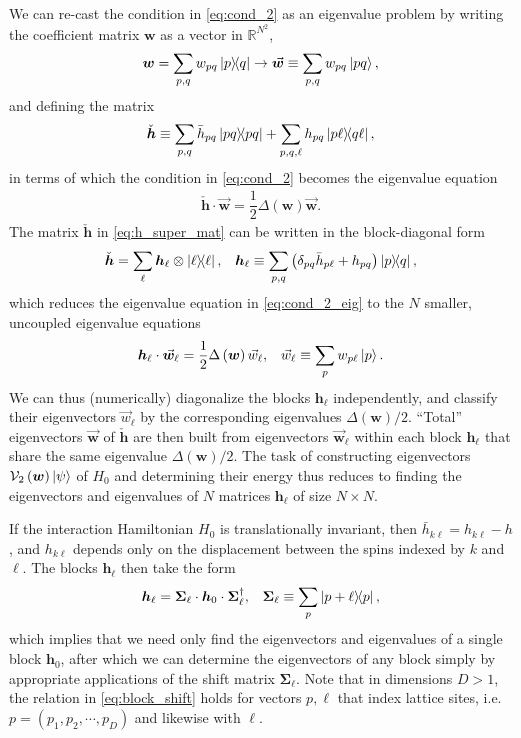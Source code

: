 \documentclass[nofootinbib,notitlepage,11pt]{revtex4-2}
\newcommand{\f}[2]{\dfrac{#1}{#2}} %
\newcommand{\p}[1]{\left(#1\right)} %
\renewcommand{\c}{\cdot} %
\newcommand{\m}{\bm} %
\renewcommand{\v}{\vec} %
\newcommand{\1}{\mathds{1}}
\newcommand{\V}{\mathcal{V}}
\newcommand{\RR}{\mathbb{R}}
\begin{document}
We can re-cast the condition in \eqref{eq:cond_2} as an eigenvalue
problem by writing the coefficient matrix $\m w$ as a vector in
$\RR^{N^2}$,
\begin{align}
  \m w = \sum_{p,q} w_{pq} \op{p}{q}
  \to \v{\m w} \equiv \sum_{p,q} w_{pq} \ket{pq},
\end{align}
and defining the matrix
\begin{align}
  \check{\m h}
  \equiv \sum_{p,q} \bar h_{pq} \op{pq}
  + \sum_{p,q,\ell} h_{pq} \op{p\ell}{q\ell},
  \label{eq:h_super_mat}
\end{align}
in terms of which the condition in \eqref{eq:cond_2} becomes the
eigenvalue equation
\begin{align}
  \check{\m h} \c \v{\m w} = \f12 \Delta\p{\m w} \v{\m w}.
  \label{eq:cond_2_eig}
\end{align}
The matrix $\check{\m h}$ in \eqref{eq:h_super_mat} can be written in
the block-diagonal form
\begin{align}
  \check{\m h} = \sum_\ell \m h_\ell \otimes \op{\ell},
  &&
  \m h_\ell
  \equiv \sum_{p,q}\p{\delta_{pq} \bar h_{p\ell} + h_{pq}} \op{p}{q},
\end{align}
which reduces the eigenvalue equation in \eqref{eq:cond_2_eig} to the
$N$ smaller, uncoupled eigenvalue equations
\begin{align}
  \m h_\ell \c \v{\m w}_\ell = \f12 \Delta\p{\m w} \v w_\ell,
  &&
  \v w_\ell \equiv \sum_p w_{p\ell} \ket{p}.
  \label{eq:cond_2_eig_block}
\end{align}
We can thus (numerically) diagonalize the blocks $\m h_\ell$
independently, and classify their eigenvectors $\v w_\ell$ by the
corresponding eigenvalues $\Delta\p{\m w}/2$.  ``Total'' eigenvectors
$\v{\m w}$ of $\check{\m h}$ are then built from eigenvectors
$\v{\m w}_\ell$ within each block $\m h_\ell$ that share the same
eigenvalue $\Delta\p{\m w}/2$.  The task of constructing eigenvectors
$\V_2\p{\m w}\ket\psi$ of $H_0$ and determining their energy thus
reduces to finding the eigenvectors and eigenvalues of $N$ matrices
$\m h_\ell$ of size $N\times N$.

If the interaction Hamiltonian $H_0$ is translationally invariant,
then $\bar h_{k\ell}=h_{k\ell}-h$, and $h_{k\ell}$ depends only on the
displacement between the spins indexed by $k$ and $\ell$.  The blocks
$\m h_\ell$ then take the form
\begin{align}
  \m h_{\ell} = \m\Sigma_\ell \c \m h_0 \c \m\Sigma_\ell^\dag,
  &&
  \m\Sigma_\ell \equiv \sum_p \op{p+\ell}{p},
  \label{eq:block_shift}
\end{align}
which implies that we need only find the eigenvectors and eigenvalues
of a single block $\m h_0$, after which we can determine the
eigenvectors of any block simply by appropriate applications of the
shift matrix $\m\Sigma_\ell$.  Note that in dimensions $D>1$, the
relation in \eqref{eq:block_shift} holds for vectors $p,\ell$ that
index lattice sites, i.e.~$p=\p{p_1,p_2,\cdots,p_D}$ and likewise with
$\ell$.
\end{document}
